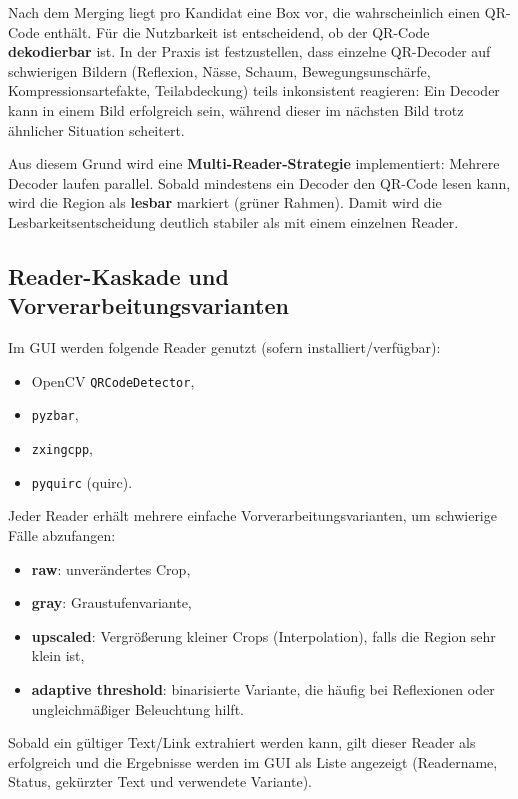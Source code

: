 Nach dem Merging liegt pro Kandidat eine Box vor, die \glqq wahrscheinlich\grqq{} einen \ac{QR}-Code enthält. Für die Nutzbarkeit ist entscheidend, ob der \ac{QR}-Code \textbf{dekodierbar} ist. In der Praxis ist festzustellen, dass einzelne \ac{QR}-Decoder auf schwierigen Bildern (Reflexion, Nässe, Schaum, Bewegungsunschärfe, Kompressionsartefakte, Teilabdeckung) teils inkonsistent reagieren: Ein Decoder kann in einem Bild erfolgreich sein, während dieser im nächsten Bild trotz ähnlicher Situation scheitert.

Aus diesem Grund wird eine \textbf{Multi-Reader-Strategie} implementiert: Mehrere Decoder laufen parallel. Sobald mindestens ein Decoder den \ac{QR}-Code lesen kann, wird die Region als \textbf{lesbar} markiert (grüner Rahmen). Damit wird die Lesbarkeitsentscheidung deutlich stabiler als mit einem einzelnen Reader.

\subsection{Reader-Kaskade und Vorverarbeitungsvarianten}
\label{subsec:decoder_pipeline}

Im \ac{GUI} werden folgende Reader genutzt (sofern installiert/verfügbar):
\begin{itemize}
    \item OpenCV \texttt{\ac{QR}CodeDetector},
    \item \texttt{pyzbar},
    \item \texttt{zxingcpp},
    \item \texttt{pyquirc} (quirc).
\end{itemize}
Jeder Reader erhält mehrere einfache Vorverarbeitungsvarianten, um schwierige Fälle abzufangen:
\begin{itemize}
    \item \textbf{raw}: unverändertes Crop,
    \item \textbf{gray}: Graustufenvariante,
    \item \textbf{upscaled}: Vergrößerung kleiner Crops (Interpolation), falls die Region sehr klein ist,
    \item \textbf{adaptive threshold}: binarisierte Variante, die häufig bei Reflexionen oder ungleichmäßiger Beleuchtung hilft.
\end{itemize}
Sobald ein gültiger Text/Link extrahiert werden kann, gilt dieser Reader als erfolgreich und die Ergebnisse werden im \ac{GUI} als Liste angezeigt (Readername, Status, gekürzter Text und verwendete Variante).

